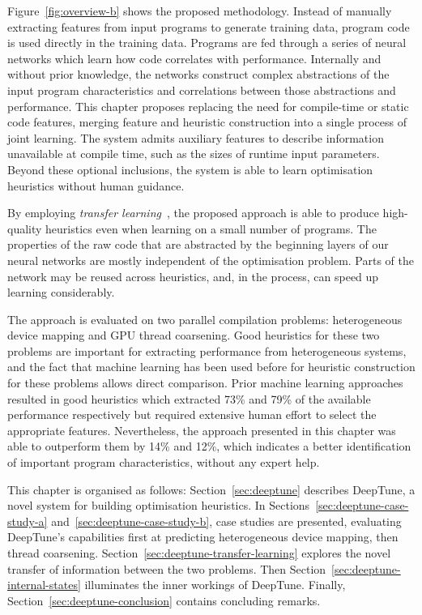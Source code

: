 Figure~\ref{fig:overview-b} shows the proposed methodology. Instead of manually extracting features from input programs to generate training data, program code is used directly in the training data. Programs are fed through a series of neural networks which learn how code correlates with performance. Internally and without prior knowledge, the networks construct complex abstractions of the input program characteristics and correlations between those abstractions and performance. This chapter proposes replacing the need for compile-time or static code features, merging feature and heuristic construction into a single process of joint learning. The system admits auxiliary features to describe information unavailable at compile time, such as the sizes of runtime input parameters. Beyond these optional inclusions, the system is able to learn optimisation heuristics without human guidance.

By employing \emph{transfer learning}~\cite{Yosinski2014}, the proposed approach is able to produce high-quality heuristics even when learning on a small number of programs. The properties of the raw code that are abstracted by the beginning layers of our neural networks are mostly independent of the optimisation problem. Parts of the network may be reused across heuristics, and, in the process, can speed up learning considerably.

The approach is evaluated on two parallel compilation problems: heterogeneous device mapping and GPU thread coarsening. Good heuristics for these two problems are important for extracting performance from heterogeneous systems, and the fact that machine learning has been used before for heuristic construction for these problems allows direct comparison. Prior machine learning approaches resulted in good heuristics which extracted 73\% and 79\% of the available performance respectively but required extensive human effort to select the appropriate features. Nevertheless, the approach presented in this chapter was able to outperform them by 14\% and 12\%, which indicates a better identification of important program characteristics, without any expert help.

This chapter is organised as follows: Section~\ref{sec:deeptune} describes DeepTune, a novel system for building optimisation heuristics. In Sections~\ref{sec:deeptune-case-study-a} and~\ref{sec:deeptune-case-study-b}, case studies are presented, evaluating DeepTune's capabilities first at predicting heterogeneous device mapping, then thread coarsening. Section~\ref{sec:deeptune-transfer-learning} explores the novel transfer of information between the two problems. Then Section~\ref{sec:deeptune-internal-states} illuminates the inner workings of DeepTune. Finally, Section~\ref{sec:deeptune-conclusion} contains concluding remarks.
